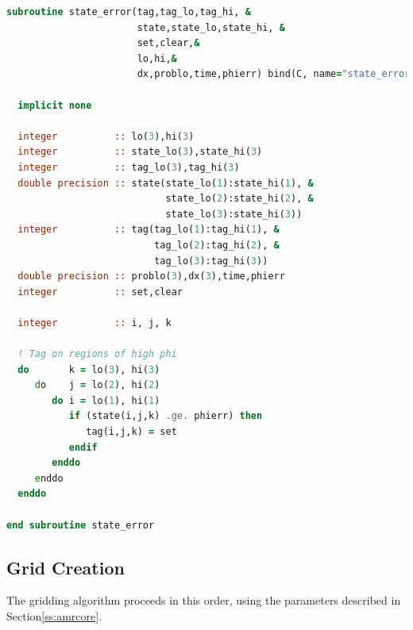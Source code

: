 \begin{lstlisting}[language=fortran]
subroutine state_error(tag,tag_lo,tag_hi, &
                       state,state_lo,state_hi, &
                       set,clear,&
                       lo,hi,&
                       dx,problo,time,phierr) bind(C, name="state_error")

  implicit none
  
  integer          :: lo(3),hi(3)
  integer          :: state_lo(3),state_hi(3)
  integer          :: tag_lo(3),tag_hi(3)
  double precision :: state(state_lo(1):state_hi(1), &
                            state_lo(2):state_hi(2), &
                            state_lo(3):state_hi(3))
  integer          :: tag(tag_lo(1):tag_hi(1), &
                          tag_lo(2):tag_hi(2), &
                          tag_lo(3):tag_hi(3))
  double precision :: problo(3),dx(3),time,phierr
  integer          :: set,clear

  integer          :: i, j, k

  ! Tag on regions of high phi
  do       k = lo(3), hi(3)
     do    j = lo(2), hi(2)
        do i = lo(1), hi(1)
           if (state(i,j,k) .ge. phierr) then
              tag(i,j,k) = set
           endif
        enddo
     enddo
  enddo

end subroutine state_error
\end{lstlisting}

\subsection{Grid Creation}

\noindent The gridding algorithm proceeds in this order, using the parameters described 
in Section\ref{ss:amrcore}.

